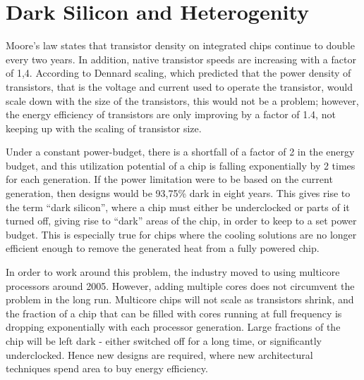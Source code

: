 
\section{Dark Silicon and Heterogenity}
\label{sec:dark-silicon}

Moore's law states that transistor density on integrated chips continue to double every
two years. In addition, native transistor speeds are increasing with a factor of 1,4.
According to Dennard scaling, which predicted that the power density of transistors, that
is the voltage and current used to operate the transistor, would scale down with the
size of the transistors, this would not be a problem; however, the energy efficiency
of transistors are only improving by a factor of 1.4, not keeping up with the scaling
of transistor size.

Under a constant power-budget, there is a shortfall of a factor of 2 in the energy budget,
and this utilization potential of a chip is falling exponentially by 2 times for each generation.
If the power limitation were to be based on the current generation, then designs would be 93,75\% dark in eight years.
This gives rise to the term ``dark silicon'', where a chip must either be underclocked or parts of
it turned off, giving rise to ``dark'' areas of the chip, in order to keep to a set power budget.
This is especially true for chips where the cooling solutions are no longer efficient enough to remove
the generated heat from a fully powered chip.

In order to work around this problem, the industry moved to using multicore processors around 2005.
However, adding multiple cores does not circumvent the problem in the long run.
Multicore chips will not scale as transistors shrink, and the fraction of a chip that can be filled with cores running at full frequency is dropping exponentially with each processor generation. 
Large fractions of the chip will be left dark - either switched off for a long time, or significantly underclocked.
Hence new designs are required, where new architectural techniques spend area to buy energy efficiency. \cite{dark-silicon}

